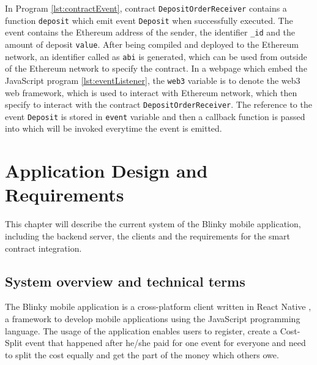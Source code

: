 \documentclass[twoside,numperchapter]{tutthesis} %
\begin{document}
In Program \ref{lst:contractEvent}, contract \texttt{DepositOrderReceiver} contains a function \texttt{deposit} which emit event \texttt{Deposit} when successfully executed. The event contains the Ethereum address of the sender, the identifier \texttt{\_id} and the amount of deposit \texttt{value}. After being compiled and deployed to the Ethereum network, an identifier called as \texttt{abi} is generated, which can be used from outside of the Ethereum network to specify the contract. In a webpage which embed the JavaScript program \ref{lst:eventListener},  the \texttt{web3} variable is to denote the web3 web framework, which is used to interact with Ethereum network, which then specify to interact with the contract \texttt{DepositOrderReceiver}. The reference to the event \texttt{Deposit} is stored in \texttt{event} variable and then a callback function is passed into which will be invoked everytime the event is emitted.

\chapter{Application Design and Requirements}
\label{ch:ApplicationDesignAndReq}

This chapter will describe the current system of the Blinky mobile application, including the backend server, the clients  and the requirements for the smart contract integration.

\section{System overview and technical terms}

The Blinky mobile application is a cross-platform client written in React Native \citep{ReactNative}, a framework to develop mobile applications using the JavaScript programming language. The usage of the application enables users to register, create a Cost-Split event that happened after he/she paid for one event for everyone and need to split the cost equally and get the part of the money which others owe.
\end{document}

